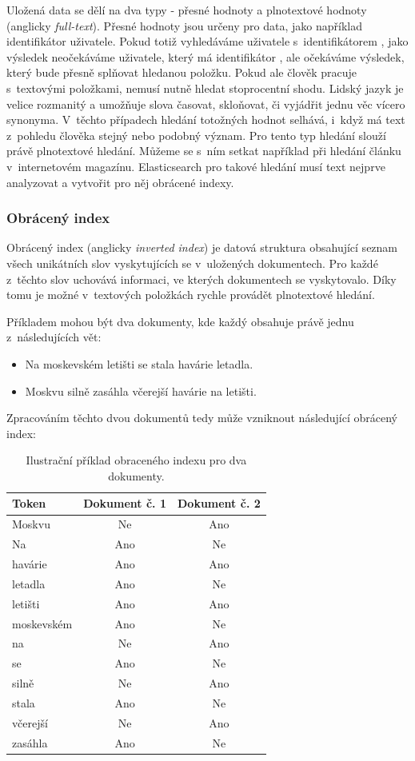 Uložená data se dělí na dva typy - přesné hodnoty a plnotextové hodnoty (anglicky \emph{full-text}). Přesné hodnoty jsou určeny pro data, jako například identifikátor uživatele. Pokud totiž vyhledáváme uživatele s~identifikátorem , jako výsledek neočekáváme uživatele, který má identifikátor , ale očekáváme výsledek, který bude přesně splňovat hledanou položku.
Pokud ale člověk pracuje s~textovými položkami, nemusí nutně hledat stoprocentní shodu. Lidský jazyk je velice rozmanitý a umožňuje slova časovat, skloňovat, či vyjádřit jednu věc vícero synonyma. %
V~těchto případech hledání totožných hodnot selhává, i~když má text z~pohledu člověka stejný nebo podobný význam. Pro tento typ hledání slouží právě plnotextové hledání. Můžeme se s~ním setkat například při hledání článku v~internetovém magazínu.
Elasticsearch pro takové hledání musí text nejprve analyzovat a vytvořit pro něj obrácené indexy.

\subsubsection*{Obrácený index}
Obrácený index (anglicky \emph{inverted index}) je datová struktura obsahující seznam všech unikátních slov vyskytujících se v~uložených dokumentech. Pro každé z~těchto slov uchovává informaci, ve kterých dokumentech se vyskytovalo. Díky tomu je možné v~textových položkách rychle provádět plnotextové hledání.

Příkladem mohou být dva dokumenty, kde každý obsahuje právě jednu z~následujících vět:
\begin{itemize}
    \item Na moskevském letišti se stala havárie letadla.
    \item Moskvu silně zasáhla včerejší havárie na letišti.
\end{itemize}
Zpracováním těchto dvou dokumentů tedy může vzniknout následující obrácený index:


\begin{table}[h!]
\centering
\begin{tabular}{ |l|c|c| } 
\hline
Token & Dokument č. 1 & Dokument č. 2 \\
\hline
Moskvu & Ne & Ano \\
Na & Ano & Ne \\
havárie & Ano & Ano \\
letadla & Ano & Ne \\
letišti & Ano & Ano \\
moskevském & Ano & Ne \\
na & Ne & Ano \\
se & Ano & Ne \\
silně & Ne & Ano \\
stala & Ano & Ne \\
včerejší & Ne & Ano \\
zasáhla & Ano & Ne \\
\hline
\end{tabular}
\caption{Ilustrační příklad obraceného indexu pro dva dokumenty.}
\end{table}

